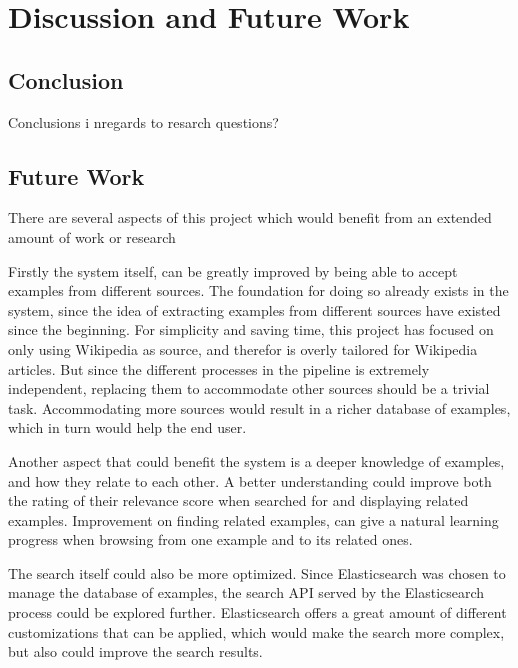 
\chapter{Discussion and Future Work}


\section{Conclusion}
Conclusions i nregards to resarch questions? 


\section{Future Work}
There are several aspects of this project which would benefit from an extended amount of work or research

Firstly the system itself, can be greatly improved by being able to accept examples from different sources. The foundation for doing so already exists in the system, since the idea of extracting examples from different sources have existed since the beginning. For simplicity and saving time, this project has focused on only using Wikipedia as source, and therefor is overly tailored for Wikipedia articles. But since the different processes in the pipeline is extremely independent, replacing them to accommodate other sources should be a trivial task. Accommodating more sources would result in a richer database of examples, which in turn would help the end user.

Another aspect that could benefit the system is a deeper knowledge of examples, and how they relate to each other. A better understanding could improve both the rating of their relevance score when searched for and displaying related examples. Improvement on finding related examples, can give a natural learning progress when browsing from one example and to its related ones.

The search itself could also be more optimized. Since Elasticsearch was chosen to manage the database of examples, the search API served by the Elasticsearch process could be explored further. Elasticsearch offers a great amount of different customizations that can be applied, which would make the search more complex, but also could improve the search results. 

\cleardoublepage